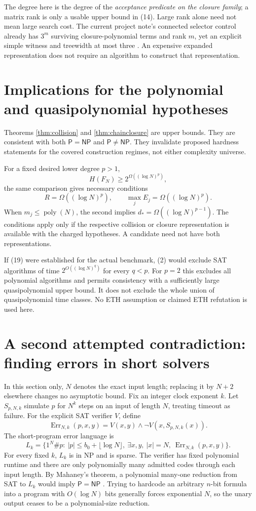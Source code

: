 \documentclass[11pt]{article}
\newcommand{\poly}{\operatorname{poly}}
\begin{document}
The degree here is the degree of the \emph{acceptance predicate on the
closure family}; a matrix rank is only a usable upper bound in (14).
Large rank alone need not mean large search cost.
The current project note's connected selector control already has
$3^m$ surviving closure-polynomial terms and rank $m$, yet an explicit
simple witness and treewidth at most three \cite{atc2026}.
An expensive expanded representation does not require an algorithm
to construct that representation.

\section{Implications for the polynomial and quasipolynomial hypotheses}

Theorems \ref{thm:collision} and \ref{thm:chainclosure} are upper bounds.
They are consistent with both $\mathsf P=\mathsf{NP}$ and
$\mathsf P\ne\mathsf{NP}$. They invalidate proposed hardness statements
for the covered construction regimes, not either complexity universe.

For a fixed desired lower degree $p>1$,
\[
 H(F_N)\ge2^{\Omega((\log N)^p)},
 \tag{19}
\]
the same comparison gives necessary conditions
\[
 R=\Omega((\log N)^p),\qquad
 \max_jE_j=\Omega((\log N)^p).
 \tag{20}
\]
When $m_j\le\poly(N)$, the second implies
$d_*=\Omega((\log N)^{p-1})$. The conditions apply only if the respective
collision or closure representation is available with the charged
hypotheses. A candidate need not have both representations.

If (19) were established for the actual benchmark, (2) would exclude
SAT algorithms of time $2^{O((\log N)^q)}$ for every $q<p$.
For $p=2$ this excludes all polynomial algorithms and permits consistency
with a sufficiently large quasipolynomial upper bound.
It does not exclude the whole union of quasipolynomial time classes.
No ETH assumption or claimed ETH refutation is used here.

\section{A second attempted contradiction: finding errors in short solvers}

In this section only, $N$ denotes the exact input length; replacing it
by $N+2$ elsewhere changes no asymptotic bound.
Fix an integer clock exponent $k$. Let $S_{p,N,k}$ simulate $p$ for
$N^k$ steps on an input of length $N$, treating timeout as failure.
For the explicit SAT verifier $V$, define
\[
 \operatorname{Err}_{N,k}(p,x,y)=
 V(x,y)\wedge\neg V(x,S_{p,N,k}(x)).
\]
The short-program error language is
\[
 L_k=\{1^N\#p:\ |p|\le b_0+\lfloor\log N\rfloor,\
       \exists x,y,\ |x|=N,\ \operatorname{Err}_{N,k}(p,x,y)\}.
 \tag{21}
\]
For every fixed $k$, $L_k$ is in NP and is sparse.
The verifier has fixed polynomial runtime and there are only
polynomially many admitted codes through each input length.
By Mahaney's theorem, a polynomial many-one reduction from SAT to $L_k$
would imply $\mathsf P=\mathsf{NP}$ \cite{mahaney1980}.
Trying to hardcode an arbitrary $n$-bit formula into a program with
$O(\log N)$ bits generally forces exponential $N$, so the unary output
ceases to be a polynomial-size reduction.
\end{document}
